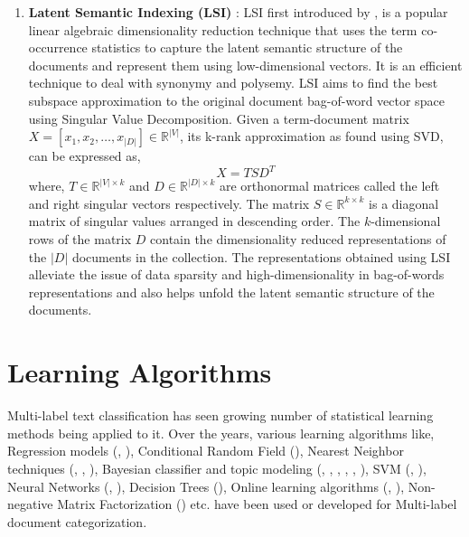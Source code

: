 \begin{enumerate}
\item{\textbf{Latent Semantic Indexing (LSI)} : } LSI first introduced by \cite{deerwester1990indexing}, is a popular linear algebraic dimensionality reduction technique that uses the term co-occurrence statistics to capture the latent semantic structure of the documents and represent them using low-dimensional vectors. It is an efficient technique to deal with synonymy and polysemy. LSI aims to find the best subspace approximation to the original document bag-of-word vector space using Singular Value Decomposition. Given a term-document matrix $X = \left[ x_{1}, x_{2}, \ldots, x_{|D|} \right] \in \mathbb{R}^{|V|}$, its k-rank approximation as found using SVD, can be expressed as, 
\begin{equation}
X = T S D^{T}
\end{equation}
where, $T \in \mathbb{R}^{|V| \times k}$ and $D \in \mathbb{R}^{|D| \times k}$ are orthonormal matrices called the left and right singular vectors respectively. The matrix $S \in \mathbb{R}^{k \times k}$ is a diagonal matrix of singular values arranged in descending order. The $k$-dimensional rows of the matrix $D$ contain the dimensionality reduced representations of the $|D|$ documents in the collection. The representations obtained using LSI alleviate the issue of data sparsity and high-dimensionality in bag-of-words representations and also helps unfold the latent semantic structure of the documents.
\end{enumerate}

\section{Learning Algorithms}
\label{sec:lalgos}
Multi-label text classification has seen growing number of statistical learning methods being applied to it. Over the years, various learning algorithms like, Regression models (\citep{cooper1994full}, \citep{fuhr1991air}), Conditional Random Field (\citep{ghamrawi2005collective}), Nearest Neighbor techniques (\citep{yang1994expert}, \citep{zhang2005k}, \citep{zhang2007ml}), Bayesian classifier and topic modeling (\citep{lewis1994comparison}, \citep{mccallum1999multi}, \citep{nigam2000text}, \citep{rubin2012statistical}, \citep{nigam1999using}, \citep{ueda2002parametric}), SVM (\citep{joachims1998text}, \citep{elisseeff2001kernel}), Neural Networks (\citep{wiener1995neural}, \citep{ng1997feature}), Decision Trees (\citep{tong1994machine}), Online learning algorithms (\citep{lewis1996training}, \citep{crammer2002new}), Non-negative Matrix Factorization (\citep{liu2006semi}) etc. have been used or developed for Multi-label document categorization.

